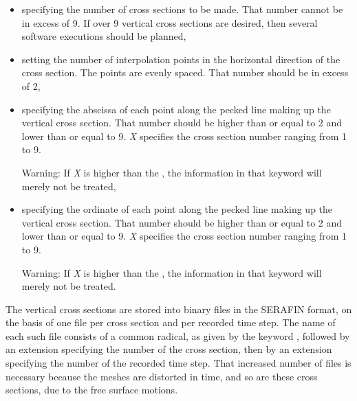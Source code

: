 \begin{itemize}
\item {} specifying the number of
cross sections to be made. That number cannot be in excess of 9. If over 9
vertical cross sections are desired, then several software executions should be
planned,

\item {}
setting the number of interpolation points in the horizontal direction of the
cross section. The points are evenly spaced. That number should be in excess of
2,

\item {} specifying the
abscissa of each point along the pecked line making up the vertical cross
section. That number should be higher than or equal to 2 and lower than or
equal to 9. \textit{X} specifies the cross section number ranging from 1 to 9.

\begin{WarningBlock}{Warning:}
If \textit{X} is higher than the , the information in that keyword will merely not be treated,
\end{WarningBlock}

\item {} specifying the
ordinate of each point along the pecked line making up the vertical cross
section. That number should be higher than or equal to 2 and lower than or
equal to 9. \textit{X} specifies the cross section number ranging from 1 to 9.

\begin{WarningBlock}{Warning:}
If \textit{X} is higher than the ,
the information in that keyword will merely not be treated.
\end{WarningBlock}
\end{itemize}

The vertical cross sections are stored into binary files in the SERAFIN format,
on the basis of one file per cross section and per recorded time step. The name
of each such file consists of a common radical, as given by the keyword
, followed by an extension specifying the
number of the cross section, then by an extension specifying the number of the
recorded time step. That increased number of files is necessary because the
meshes are distorted in time, and so are these cross sections, due to the free
surface motions.

